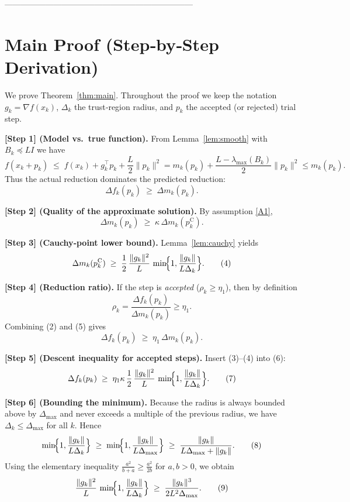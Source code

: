 \documentclass{article}
\begin{document}
---------------------------------------------------------------------

\section*{Main Proof (Step‑by‑Step Derivation)}
We prove Theorem~\ref{thm:main}.  Throughout the proof we keep the notation
\(g_k=\nabla f(x_k)\), \(\Delta_k\) the trust‑region radius, and \(p_k\) the
accepted (or rejected) trial step.

\bigskip
\noindent\textbf{[Step 1] (Model vs.\ true function).}  
From Lemma~\ref{lem:smooth} with \(B_k\preceq L I\) we have
\[
f(x_k+p_k)\;\le\; f(x_k)+g_k^{\top}p_k+\frac{L}{2}\|p_k\|^2
= m_k(p_k)+\frac{L-\lambda_{\max}(B_k)}{2}\|p_k\|^2
\le m_k(p_k).
\tag{1}
\]
Thus the actual reduction dominates the predicted reduction:
\[
\Delta f_k(p_k)\;\ge\;\Delta m_k(p_k).
\tag{2}
\]

\noindent\textbf{[Step 2] (Quality of the approximate solution).}  
By assumption \eqref{A1},
\[
\Delta m_k(p_k)\;\ge\;\kappa\,\Delta m_k(p_k^{\text{C}}).
\tag{3}
\]

\noindent\textbf{[Step 3] (Cauchy‑point lower bound).}  
Lemma~\ref{lem:cauchy} yields
\[
\Delta m_k(p_k^{\text{C}})\;\ge\;
\frac{1}{2}\,\frac{\|g_k\|^2}{L}\,
\min\!\Bigl\{1,\frac{\|g_k\|}{L\Delta_k}\Bigr\}.
\tag{4}
\]

\noindent\textbf{[Step 4] (Reduction ratio).}  
If the step is \emph{accepted} (\(\rho_k\ge\eta_1\)), then by definition
\[
\rho_k=\frac{\Delta f_k(p_k)}{\Delta m_k(p_k)}\ge\eta_1.
\tag{5}
\]
Combining (2) and (5) gives
\[
\Delta f_k(p_k)\;\ge\;\eta_1\,\Delta m_k(p_k).
\tag{6}
\]

\noindent\textbf{[Step 5] (Descent inequality for accepted steps).}  
Insert (3)–(4) into (6):
\[
\Delta f_k(p_k)
\;\ge\;
\eta_1\kappa\,
\frac{1}{2}\,\frac{\|g_k\|^2}{L}\,
\min\!\Bigl\{1,\frac{\|g_k\|}{L\Delta_k}\Bigr\}.
\tag{7}
\]

\noindent\textbf{[Step 6] (Bounding the minimum).}  
Because the radius is always bounded above by \(\Delta_{\max}\) and never
exceeds a multiple of the previous radius, we have \(\Delta_k\le\Delta_{\max}\)
for all \(k\).  Hence
\[
\min\!\Bigl\{1,\frac{\|g_k\|}{L\Delta_k}\Bigr\}
\;\ge\;
\min\!\Bigl\{1,\frac{\|g_k\|}{L\Delta_{\max}}\Bigr\}
\;\ge\;
\frac{\|g_k\|}{L\Delta_{\max}+\|g_k\|}.
\tag{8}
\]
Using the elementary inequality \(\frac{a^2}{b+a}\ge\frac{a^2}{2b}\) for
\(a,b>0\), we obtain
\[
\frac{\|g_k\|^2}{L}\,
\min\!\Bigl\{1,\frac{\|g_k\|}{L\Delta_k}\Bigr\}
\;\ge\;
\frac{\|g_k\|^3}{2L^2\Delta_{\max}}.
\tag{9}
\]
\end{document}
